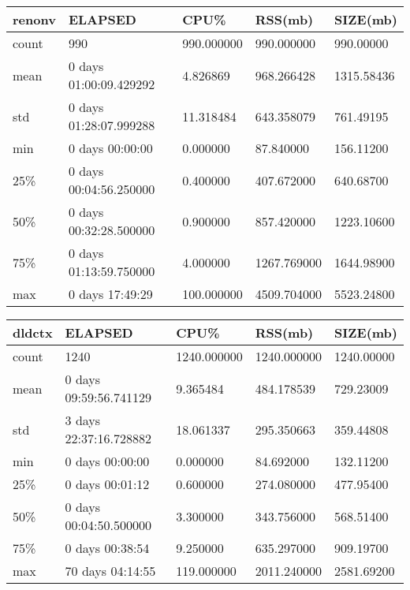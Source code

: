 \documentclass{article}
\begin{document}
\begin{tabular}{|l|l|l|l|l|}
\hline 
\hline renonv& ELAPSED&   CPU\%&  RSS(mb)&   SIZE(mb) \\
\hline count&    990& 990.000000&  990.000000&  990.00000 \\
\hline mean&  0 days 01:00:09.429292&  4.826869&  968.266428& 1315.58436 \\
\hline std&  0 days 01:28:07.999288&  11.318484&  643.358079&  761.49195 \\
\hline min&   0 days 00:00:00&  0.000000&  87.840000&  156.11200 \\
\hline 25\%&  0 days 00:04:56.250000&  0.400000&  407.672000&  640.68700 \\
\hline 50\%&  0 days 00:32:28.500000&  0.900000&  857.420000& 1223.10600 \\
\hline 75\%&  0 days 01:13:59.750000&  4.000000& 1267.769000& 1644.98900 \\
\hline max&   0 days 17:49:29& 100.000000& 4509.704000& 5523.24800 \\
\hline 
\end{tabular}
 
\begin{tabular}{|l|l|l|l|l|}
\hline 
\hline dldctx& ELAPSED&    CPU\%&  RSS(mb)&   SIZE(mb) \\
\hline count&   1240& 1240.000000& 1240.000000& 1240.00000 \\
\hline mean&  0 days 09:59:56.741129&   9.365484&  484.178539&  729.23009 \\
\hline std&  3 days 22:37:16.728882&  18.061337&  295.350663&  359.44808 \\
\hline min&   0 days 00:00:00&   0.000000&  84.692000&  132.11200 \\
\hline 25\%&   0 days 00:01:12&   0.600000&  274.080000&  477.95400 \\
\hline 50\%&  0 days 00:04:50.500000&   3.300000&  343.756000&  568.51400 \\
\hline 75\%&   0 days 00:38:54&   9.250000&  635.297000&  909.19700 \\
\hline max&  70 days 04:14:55&  119.000000& 2011.240000& 2581.69200 \\
\hline 
\end{tabular}
 
\end{document}
